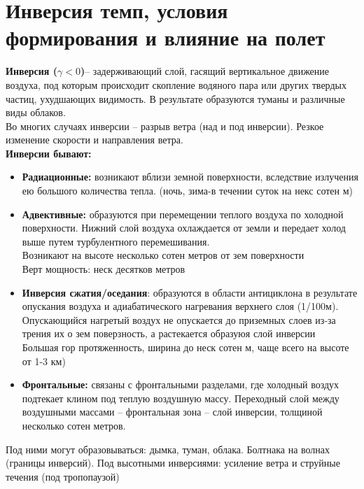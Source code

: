
\section{Инверсия темп, условия формирования и влияние на полет}
\textbf{Инверсия ($\gamma<0$)}– задерживающий слой, гасящий вертикальное движение воздуха, под которым происходит скопление водяного пара или других твердых частиц, ухудшающих видимость. В результате образуются туманы и различные виды облаков.\\
Во многих случаях инверсии – разрыв ветра (над и под инверсии). Резкое изменение скорости и направления ветра.\\
\textbf{Инверсии бывают:}
\begin{itemize}
	\item \textbf{Радиационные:} возникают вблизи земной поверхности, вследствие излучения ею большого количества тепла. (ночь, зима-в течении суток на некс сотен м)\\
	\item \textbf{Адвективные:} образуются при перемещении теплого воздуха по холодной поверхности. Нижний слой воздуха охлаждается от земли и передает холод выше путем турбулентного перемешивания.\\
	Возникают на высоте несколько сотен метров от зем поверхности\\
	Верт мощность: неск десятков метров
	\item \textbf{Инверсия сжатия/оседания}: образуются в области антициклона в результате опускания воздуха и адиабатического нагревания верхнего слоя (1/100м). Опускающийся нагретый воздух не опускается до приземных слоев из-за трения их о зем поверзность, а растекается образуюя слой инверсии\\
	Большая гор протяженность, ширина до неск сотен м, чаще всего на высоте от 1-3 км)
	\item \textbf{Фронтальные:} связаны с фронтальными разделами, где холодный воздух подтекает клином под теплую воздушную массу. Переходный слой между воздушными массами – фронтальная зона – слой инверсии, толщиной несколько сотен метров.
\end{itemize}
Под ними могут образовываться: дымка, туман, облака. Болтнака на волнах (границы инверсий). Под высотными инверсиями: усиление ветра и струйные течения (под тропопаузой)
